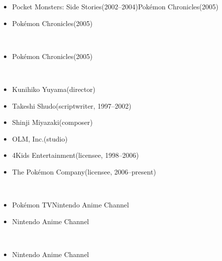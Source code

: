 \documentclass[a4paper,12pt]{article}
\begin{document}
\begin{itemize}
\item Pocket Monsters: Side Stories(2002–2004)Pokémon Chronicles(2005)
\item Pokémon Chronicles(2005)
\end{itemize}\\ \par \vspace{0.5cm}

\begin{itemize}
\item Pokémon Chronicles(2005)
\end{itemize}\\ \par \vspace{0.5cm}

\begin{itemize}
\item Kunihiko Yuyama(director)
\item Takeshi Shudo(scriptwriter, 1997–2002)
\item Shinji Miyazaki(composer)
\item OLM, Inc.(studio)
\item 4Kids Entertainment(licensee, 1998–2006)
\item The Pokémon Company(licensee, 2006–present)
\end{itemize}\\ \par \vspace{0.5cm}

\begin{itemize}
\item Pokémon TVNintendo Anime Channel
\item Nintendo Anime Channel
\end{itemize}\\ \par \vspace{0.5cm}

\begin{itemize}
\item Nintendo Anime Channel
\end{itemize}\\ \par \vspace{0.5cm}
\end{document}
